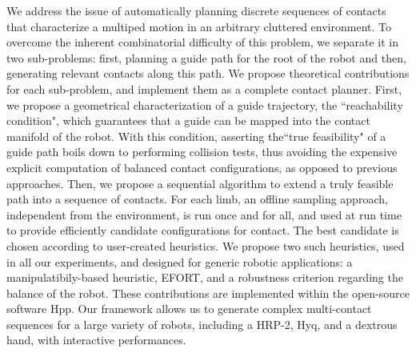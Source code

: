 We address the issue of automatically planning discrete sequences of contacts
that characterize a multiped motion in an arbitrary cluttered environment.
To overcome the inherent combinatorial difficulty of this problem, we separate it
in two sub-problems: first, planning a guide path for the root of the robot and
then, generating relevant contacts along this path.
We propose theoretical contributions for each sub-problem, and implement them
as a complete contact planner. 
First, we propose a geometrical characterization of a guide trajectory, the ``reachability condition", which guarantees that a
guide can be mapped into the contact manifold of the robot. With this condition, asserting the``true feasibility" 
of a guide path boils down to performing collision tests, thus avoiding the expensive explicit computation of balanced contact configurations, as opposed to previous approaches.
Then, we propose a sequential algorithm to extend a truly feasible path into a sequence of contacts. For each limb, an offline sampling approach,
independent from the environment, is run once and for all, and used at run time to provide efficiently candidate configurations for contact.
The best candidate is chosen according to user-created  heuristics. We propose two such heuristics, used in all our experiments, and 
designed for generic robotic applications: a manipulatibily-based heuristic, EFORT, and a robustness criterion regarding the balance of the robot.
These contributions are implemented within the open-source software Hpp. Our framework allows us to generate complex multi-contact sequences for a large
variety of robots, including a HRP-2, Hyq, and a dextrous hand, with interactive performances.
